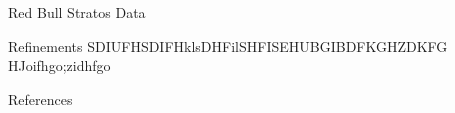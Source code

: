 \documentclass[final]{beamer}
\newlength{\sepwid}
\newlength{\onecolwid}
\begin{document}
\begin{frame}
\begin{columns}[t]
\begin{column}{\onecolwid}
\begin{exampleblock}{Red Bull Stratos Data}
\end{exampleblock}


\begin{exampleblock}{Refinements}
SDIUFHSDIFHklsDHFilSHFISEHUBGIBDFKGHZDKFG HJoifhgo;zidhfgo
\end{exampleblock}

\begin{exampleblock}{References}
    \printbibliography
\end{exampleblock}





\end{column} %

\begin{column}{\sepwid}\end{column} %

\end{columns} %

\end{frame} %
\end{document}
